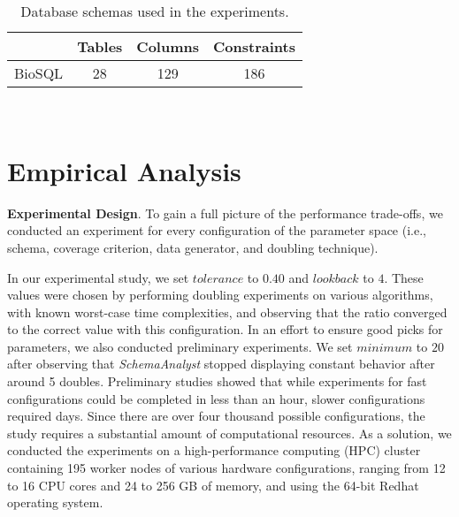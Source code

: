 
\begin{table}[t]
  \centering

  \begin{tabular}{c | c c c}
                             & Tables & Columns & Constraints \\ \hline
    BioSQL                   & 28     & 129     & 186
  \end{tabular}

  \caption{Database schemas used in the experiments.}~\label{tab:schemas}
\end{table}

\vspace{-.05in}
\section{Empirical Analysis}
\vspace{-.05in}

\textbf{Experimental Design}. To gain a full picture of the performance trade-offs, we conducted an experiment for every
configuration of the parameter space (i.e., schema, coverage criterion, data generator, and doubling technique).

In our experimental study, we set $\mathit{tolerance}$ to $0.40$ and $\mathit{lookback}$ to $4$. These values were
chosen by performing doubling experiments on various algorithms, with known worst-case time complexities, and observing
that the ratio converged to the correct value with this configuration.  In an effort to ensure good picks for
parameters, we also conducted preliminary experiments. We set $\mathit{minimum}$ to $20$ after observing that
\textit{SchemaAnalyst} stopped displaying constant behavior after around 5 doubles.  Preliminary studies showed that
while experiments for fast configurations could be completed in less than an hour, slower configurations required days.
Since there are over four thousand possible configurations, the study requires a substantial amount of computational
resources.  As a solution, we conducted the experiments on a high-performance computing (HPC) cluster containing 195
worker nodes of various hardware configurations, ranging from 12 to 16 CPU cores and 24 to 256 GB of memory, and using
the 64-bit Redhat operating system.




